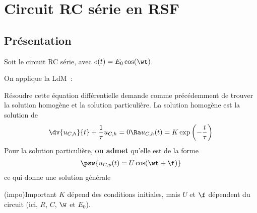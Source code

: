 \documentclass[../../main/main.tex]{subfiles}
\begin{document}
\section{Circuit RC série en RSF}
\subsection{Présentation}
\noindent
\begin{minipage}[t]{.45\linewidth}
	Soit le circuit RC série, avec $e(t) = E_0\cos(\wt)$.
	\begin{center}
	\end{center}
\end{minipage}
\hfill
\begin{minipage}[t]{.5\linewidth}
	On applique la LdM~:
\end{minipage}
\bigbreak
Résoudre cette équation différentielle demande comme précédemment de trouver la
solution homogène et la solution particulière. La solution homogène est la
solution de
\begin{gather*}
	\dv{u_{C,h}}{t} + \frac{1}{\tau}u_{C,h} = 0
	\Ra
	u_{C,h}(t) = K\exp \left( - \frac{t}{\tau} \right)
\end{gather*}
Pour la solution particulière, \textbf{on admet} qu'elle est de la forme
\begin{gather*}
	\psw{
		u_{C,p}(t) = U\cos(\wt + \f)
	}
\end{gather*}
ce qui donne une solution générale
\psw{
	\[\boxed{u_C(t) = K\exp \left( - \frac{t}{\tau} \right) + U\cos(\wt + \f)}\]
}
\vspace{-15pt}
\begin{tcb}[label=ror:CIounon](impo){Important}
	$K$ dépend des conditions initiales, mais
	\smallbreak \centering\large
	$U$ et $\f$ dépendent du circuit (ici, $R$, $C$, $\w$ et $E_0$).
\end{tcb}
\end{document}
